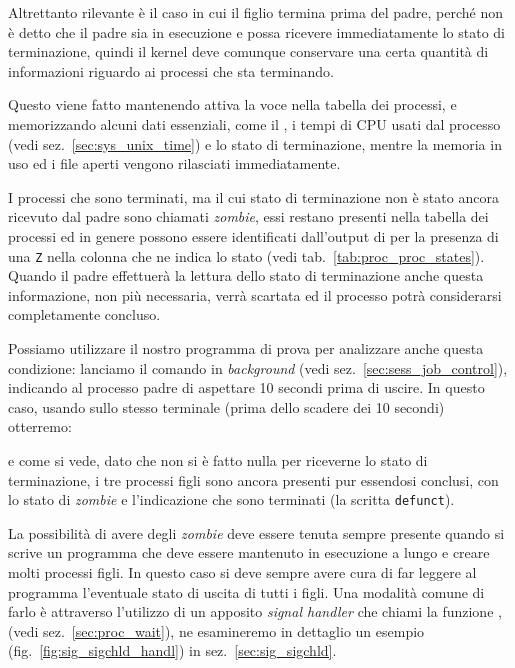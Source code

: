 Altrettanto rilevante è il caso in cui il figlio termina prima del padre,
perché non è detto che il padre sia in esecuzione e possa ricevere
immediatamente lo stato di terminazione, quindi il kernel deve comunque
conservare una certa quantità di informazioni riguardo ai processi che sta
terminando.

Questo viene fatto mantenendo attiva la voce nella tabella dei processi, e
memorizzando alcuni dati essenziali, come il , i tempi di CPU usati
dal processo (vedi sez.~\ref{sec:sys_unix_time}) e lo stato di terminazione,
mentre la memoria in uso ed i file aperti vengono rilasciati immediatamente. 


I processi che sono terminati, ma il cui stato di terminazione non è stato
ancora ricevuto dal padre sono chiamati \textit{zombie}, essi restano presenti
nella tabella dei processi ed in genere possono essere identificati
dall'output di  per la presenza di una \texttt{Z} nella colonna che ne
indica lo stato (vedi tab.~\ref{tab:proc_proc_states}). Quando il padre
effettuerà la lettura dello stato di terminazione anche questa informazione,
non più necessaria, verrà scartata ed il processo potrà considerarsi
completamente concluso.

Possiamo utilizzare il nostro programma di prova per analizzare anche questa
condizione: lanciamo il comando  in \textit{background} (vedi
sez.~\ref{sec:sess_job_control}), indicando al processo padre di aspettare 10
secondi prima di uscire. In questo caso, usando  sullo stesso
terminale (prima dello scadere dei 10 secondi) otterremo:
e come si vede, dato che non si è fatto nulla per riceverne lo stato di
terminazione, i tre processi figli sono ancora presenti pur essendosi
conclusi, con lo stato di \textit{zombie} e l'indicazione che sono terminati
(la scritta \texttt{defunct}).

La possibilità di avere degli \textit{zombie} deve essere tenuta sempre
presente quando si scrive un programma che deve essere mantenuto in esecuzione
a lungo e creare molti processi figli. In questo caso si deve sempre avere
cura di far leggere al programma l'eventuale stato di uscita di tutti i
figli. Una modalità comune di farlo è attraverso l'utilizzo di un apposito
\textit{signal handler} che chiami la funzione , (vedi
sez.~\ref{sec:proc_wait}), ne esamineremo in dettaglio un esempio
(fig.~\ref{fig:sig_sigchld_handl}) in sez.~\ref{sec:sig_sigchld}.

